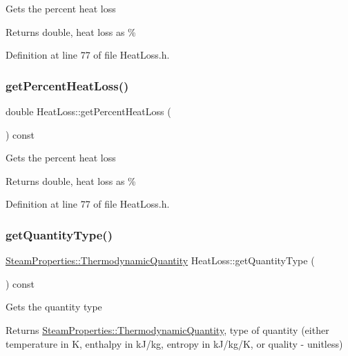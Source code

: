 Gets the percent heat loss \begin{DoxyReturn}{Returns}
double, heat loss as \% 
\end{DoxyReturn}


Definition at line 77 of file Heat\+Loss.\+h.

\mbox{\label{class_heat_loss_acbbf01db5cde157057e4d766cab22382}} 
\subsubsection{\texorpdfstring{get\+Percent\+Heat\+Loss()}{getPercentHeatLoss()}\hspace{0.1cm}{\footnotesize\ttfamily [3/3]}}
{\footnotesize\ttfamily double Heat\+Loss\+::get\+Percent\+Heat\+Loss (\begin{DoxyParamCaption}{ }\end{DoxyParamCaption}) const\hspace{0.3cm}{\ttfamily [inline]}}

Gets the percent heat loss \begin{DoxyReturn}{Returns}
double, heat loss as \% 
\end{DoxyReturn}


Definition at line 77 of file Heat\+Loss.\+h.

\mbox{\label{class_heat_loss_a92dc973c0fd81df192207b3df55d6c2b}} 
\subsubsection{\texorpdfstring{get\+Quantity\+Type()}{getQuantityType()}\hspace{0.1cm}{\footnotesize\ttfamily [1/3]}}
{\footnotesize\ttfamily \hyperlink{class_steam_properties_ae0294bedf7d178c2d8fb6aed0f62fbff}{Steam\+Properties\+::\+Thermodynamic\+Quantity} Heat\+Loss\+::get\+Quantity\+Type (\begin{DoxyParamCaption}{ }\end{DoxyParamCaption}) const\hspace{0.3cm}{\ttfamily [inline]}}

Gets the quantity type \begin{DoxyReturn}{Returns}
\hyperlink{class_steam_properties_ae0294bedf7d178c2d8fb6aed0f62fbff}{Steam\+Properties\+::\+Thermodynamic\+Quantity}, type of quantity (either temperature in K, enthalpy in k\+J/kg, entropy in k\+J/kg/K, or quality -\/ unitless) 
\end{DoxyReturn}


